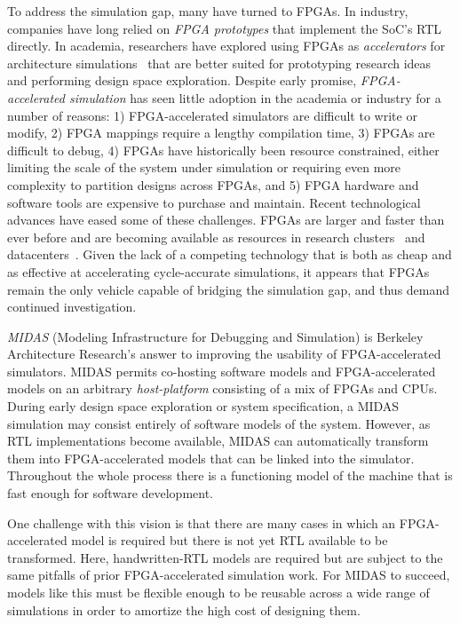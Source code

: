 To address the simulation gap, many have turned to FPGAs. In industry,
companies have long relied on \emph{FPGA prototypes} that implement the SoC's
RTL directly. In academia, researchers have explored using FPGAs as \emph{accelerators}
for architecture simulations~\cite{fast, fame, hasim, protoflex,ramp} that are
better suited for prototyping research ideas and performing design space
exploration. Despite early promise, \emph{FPGA-accelerated simulation} has seen
little adoption in the academia or industry for a number of reasons: 1)
FPGA-accelerated simulators are difficult to write or modify, 2) FPGA mappings
require a lengthy compilation time, 3) FPGAs are difficult to debug, 4) FPGAs
have historically been resource constrained, either limiting the scale of the
system under simulation or requiring even more complexity to partition designs
across FPGAs, and 5) FPGA hardware and software tools are expensive to purchase
and maintain.  Recent technological advances have eased some of these
challenges. FPGAs are larger and faster than ever before and are becoming
available as resources in research clusters~\cite{catapultannounce} and
datacenters~\cite{amazonf1}.  Given the lack of a competing technology that is
both as cheap and as effective at accelerating cycle-accurate simulations, it
appears that FPGAs remain the only vehicle capable of bridging the simulation
gap, and thus demand continued investigation.

\emph{MIDAS} (Modeling Infrastructure for Debugging and Simulation) is Berkeley
Architecture Research's answer to improving the usability of FPGA-accelerated
simulators. MIDAS permits co-hosting software models and FPGA-accelerated
models on an arbitrary \emph{host-platform} consisting of a mix of FPGAs and
CPUs.  During early design space exploration or system specification, a MIDAS
simulation may consist entirely of software models of the system.  However, as
RTL implementations become available, MIDAS can automatically transform them
into FPGA-accelerated models that can be linked into the simulator. Throughout
the whole process there is a functioning model of the machine that is fast
enough for software development.

One challenge with this vision is that there are many cases in which an
FPGA-accelerated model is required but there is not yet RTL available to be
transformed. Here, handwritten-RTL models are required but are subject to the
same pitfalls of prior FPGA-accelerated simulation work. For MIDAS to succeed,
models like this must be flexible enough to be reusable across a wide range of
simulations in order to amortize the high cost of designing them.

